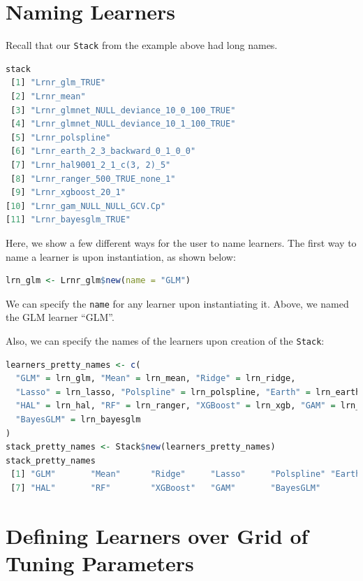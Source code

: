 \documentclass[
  12pt, krantz2,
]{krantz}
\newcommand{\passthrough}[1]{#1}
\newcommand{\1}{\mathbbm{1}}
\theoremstyle{definition}
\theoremstyle{definition}
\theoremstyle{definition}
\theoremstyle{definition}
\theoremstyle{remark}
\begin{document}
\hypertarget{naming-learners}{%
\section{Naming Learners}\label{naming-learners}}

Recall that our \passthrough{\lstinline!Stack!} from the example above had long names.

\begin{lstlisting}[language=R]
stack
 [1] "Lrnr_glm_TRUE"                          
 [2] "Lrnr_mean"                              
 [3] "Lrnr_glmnet_NULL_deviance_10_0_100_TRUE"
 [4] "Lrnr_glmnet_NULL_deviance_10_1_100_TRUE"
 [5] "Lrnr_polspline"                         
 [6] "Lrnr_earth_2_3_backward_0_1_0_0"        
 [7] "Lrnr_hal9001_2_1_c(3, 2)_5"             
 [8] "Lrnr_ranger_500_TRUE_none_1"            
 [9] "Lrnr_xgboost_20_1"                      
[10] "Lrnr_gam_NULL_NULL_GCV.Cp"              
[11] "Lrnr_bayesglm_TRUE"                     
\end{lstlisting}

Here, we show a few different ways for the user to name learners. The first way
to name a learner is upon instantiation, as shown below:

\begin{lstlisting}[language=R]
lrn_glm <- Lrnr_glm$new(name = "GLM")
\end{lstlisting}

We can specify the \passthrough{\lstinline!name!} for any learner upon instantiating it. Above,
we named the GLM learner ``GLM''.

Also, we can specify the names of the learners upon creation of the \passthrough{\lstinline!Stack!}:

\begin{lstlisting}[language=R]
learners_pretty_names <- c(
  "GLM" = lrn_glm, "Mean" = lrn_mean, "Ridge" = lrn_ridge, 
  "Lasso" = lrn_lasso, "Polspline" = lrn_polspline, "Earth" = lrn_earth, 
  "HAL" = lrn_hal, "RF" = lrn_ranger, "XGBoost" = lrn_xgb, "GAM" = lrn_gam, 
  "BayesGLM" = lrn_bayesglm
)
stack_pretty_names <- Stack$new(learners_pretty_names)
stack_pretty_names
 [1] "GLM"       "Mean"      "Ridge"     "Lasso"     "Polspline" "Earth"    
 [7] "HAL"       "RF"        "XGBoost"   "GAM"       "BayesGLM" 
\end{lstlisting}

\hypertarget{defining-learners-over-grid-of-tuning-parameters}{%
\section{Defining Learners over Grid of Tuning Parameters}\label{defining-learners-over-grid-of-tuning-parameters}}
\end{document}
